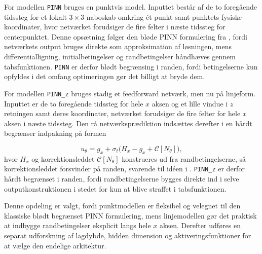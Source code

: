 For modellen \texttt{PINN} bruges en punktvis model. Inputtet består af de to foregående tidssteg for et lokalt $3\times 3$ naboskab omkring ét punkt samt punktets fysiske koordinater, hvor netværket forudsiger de fire felter i næste tidssteg for centerpunktet. Denne opsætning følger den bløde PINN formulering fra \cite{raissi2017pinn_part1}, fordi netværkets output bruges direkte som approksimation af løsningen, mens differentialligning, initialbetingelser og randbetingelser håndhæves gennem tabsfunktionen. 
\texttt{PINN} er derfor blødt begrænsing i randen, fordi betingelserne kun opfyldes i det omfang optimeringen gør det billigt at bryde dem.

For modellen \texttt{PINN\_z} bruges stadig et feedforward netværk, men nu på linjeform. Inputtet er de to foregående tidssteg for hele $x$ aksen og et lille vindue i $z$ retningen samt deres koordinater,
netværket forudsiger de fire felter for hele $x$ aksen i næste tidssteg. 
Den rå netværksprædiktion indsættes derefter i en hårdt begrænser indpakning på formen

\begin{equation}
    u_\theta = g_x + \sigma_t\bigl(H_x - g_x + \mathcal{C}[N_\theta]\bigr),
\end{equation}
hvor $H_x$ og korrektionsleddet $\mathcal{C}[N_\theta]$ konstrueres ud fra randbetingelserne, så korrektionsleddet forsvinder på randen, svarende til idéen i \cite{lagaris1997ann_pde}. \texttt{PINN\_z} er 
derfor hårdt begrænset i randen, fordi randbetingelserne bygges direkte ind i selve outputkonstruktionen i stedet for kun at blive straffet i tabsfunktionen.

Denne opdeling er valgt, fordi punktmodellen er fleksibel og velegnet til den klassiske blødt begrænset PINN formulering, mens linjemodellen gør det praktisk at indbygge randbetingelser eksplicit langs hele $x$ aksen. Derefter udføres en separat udforskning af lagdybde, hidden dimension og aktiveringsfunktioner for at vælge den endelige arkitektur.
